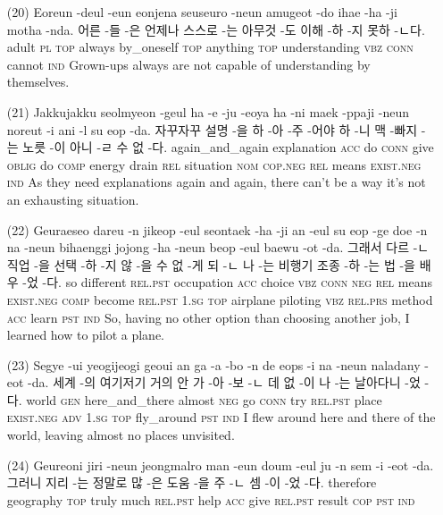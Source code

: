 \begin{itemize}
\item [(20)]
\tgl
		{Eoreun -deul -eun eonjena seuseuro -neun amugeot -do ihae -ha -ji motha -nda.}
		{어른 -들 -은 언제나 스스로 -는 아무것 -도 이해 -하 -지 못하 -ㄴ다.}
		{adult	\textsc{pl}	\textsc{top}	always	by\_oneself	\textsc{top}	anything	\textsc{top}	understanding	\textsc{vbz}	\textsc{conn}	cannot	\textsc{ind}}
		{Grown-ups always are not capable of understanding by themselves.}

\item [(21)]
\tgl
		{Jakkujakku seolmyeon -geul ha -e -ju -eoya ha -ni maek -ppaji -neun noreut -i ani -l su eop -da.}
		{자꾸자꾸 설명 -을 하 -아 -주 -어야 하 -니 맥 -빠지 -는 노릇 -이 아니 -ㄹ 수 없 -다.}
		{again\_and\_again	explanation	\textsc{acc}	do	\textsc{conn}	give	\textsc{oblig}	do	\textsc{comp}	energy	drain	\textsc{rel}	situation	\textsc{nom}	\textsc{cop.neg}	\textsc{rel}	means	\textsc{exist.neg}	\textsc{ind}}
		{As they need explanations again and again, there can't be a way it's not an exhausting situation.}

\item [(22)]
\tgl
		{Geuraeseo dareu -n jikeop -eul seontaek -ha -ji an -eul su eop -ge doe -n na -neun bihaenggi jojong -ha -neun beop -eul baewu -ot -da.}
		{그래서 다르 -ㄴ 직업 -을 선택 -하 -지 않 -을 수 없 -게 되 -ㄴ 나 -는 비행기 조종 -하 -는 법 -을 배우 -었 -다.}
		{so	different	\textsc{rel.pst}	occupation	\textsc{acc}	choice	\textsc{vbz}	\textsc{conn}	\textsc{neg}	\textsc{rel}	means	\textsc{exist.neg}	\textsc{comp}	become	\textsc{rel.pst}	\textsc{1.sg}	\textsc{top}	airplane	piloting	\textsc{vbz}	\textsc{rel.prs}	method	\textsc{acc}	learn	\textsc{pst} \textsc{ind}}
		{So, having no other option than choosing another job, I learned how to pilot a plane.}

\item [(23)]
\tgl
		{Segye -ui yeogijeogi geoui an ga -a -bo -n de eops -i na -neun naladany -eot -da.}
		{세계 -의 여기저기 거의 안 가 -아 -보 -ㄴ 데 없 -이 나 -는 날아다니 -었 -다.}
		{world	\textsc{gen}	here\_and\_there	almost	\textsc{neg}	go	\textsc{conn}	try	\textsc{rel.pst}	place	\textsc{exist.neg}	\textsc{adv}	\textsc{1.sg}	\textsc{top}	fly\_around	\textsc{pst} \textsc{ind}}
		{I flew around here and there of the world, leaving almost no places unvisited.}

\item [(24)]
\tgl
		{Geureoni jiri -neun jeongmalro man -eun doum -eul ju -n sem -i -eot -da.}
		{그러니 지리 -는 정말로 많 -은 도움 -을 주 -ㄴ 셈 -이 -었 -다.}
		{therefore	geography	\textsc{top}	truly	much	\textsc{rel.pst}	help	\textsc{acc}	give	\textsc{rel.pst}	result	\textsc{cop}	\textsc{pst}	\textsc{ind}}
		{}


\end{itemize}

